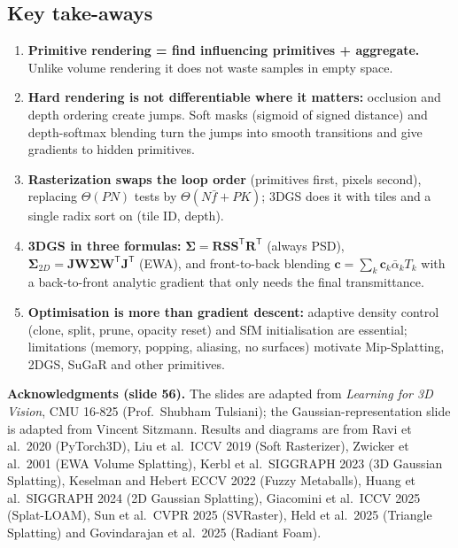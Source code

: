 \documentclass[11pt,a4paper]{article}
\newcommand{\T}{^{\mathsf T}}
\newcommand{\abar}{\bar\alpha}
\theoremstyle{definition}
\theoremstyle{algstyle}
\theoremstyle{plain}
\theoremstyle{remark}
\begin{document}
\subsection*{Key take-aways}
\begin{enumerate}
\item \textbf{Primitive rendering = find influencing primitives + aggregate.} Unlike volume rendering it does not waste samples in empty space.
\item \textbf{Hard rendering is not differentiable where it matters:} occlusion and depth ordering create jumps. Soft masks (sigmoid of signed distance) and depth-softmax blending turn the jumps into smooth transitions and give gradients to hidden primitives.
\item \textbf{Rasterization swaps the loop order} (primitives first, pixels second), replacing $\Theta(PN)$ tests by $\Theta(N\bar f+PK)$; 3DGS does it with tiles and a single radix sort on (tile ID, depth).
\item \textbf{3DGS in three formulas:} $\bm\Sigma=\bm R\bm S\bm S\T\bm R\T$ (always PSD), $\bm\Sigma_{2D}=\bm J\bm W\bm\Sigma\bm W\T\bm J\T$ (EWA), and front-to-back blending $\bm c=\sum_k\bm c_k\abar_kT_k$ with a back-to-front analytic gradient that only needs the final transmittance.
\item \textbf{Optimisation is more than gradient descent:} adaptive density control (clone, split, prune, opacity reset) and SfM initialisation are essential; limitations (memory, popping, aliasing, no surfaces) motivate Mip-Splatting, 2DGS, SuGaR and other primitives.
\end{enumerate}

\bigskip
\textbf{Acknowledgments (slide 56).} The slides are adapted from \emph{Learning for 3D Vision}, CMU 16-825 (Prof.\ Shubham Tulsiani); the Gaussian-representation slide is adapted from Vincent Sitzmann. Results and diagrams are from Ravi et al.\ 2020 (PyTorch3D), Liu et al.\ ICCV 2019 (Soft Rasterizer), Zwicker et al.\ 2001 (EWA Volume Splatting), Kerbl et al.\ SIGGRAPH 2023 (3D Gaussian Splatting), Keselman and Hebert ECCV 2022 (Fuzzy Metaballs), Huang et al.\ SIGGRAPH 2024 (2D Gaussian Splatting), Giacomini et al.\ ICCV 2025 (Splat-LOAM), Sun et al.\ CVPR 2025 (SVRaster), Held et al.\ 2025 (Triangle Splatting) and Govindarajan et al.\ 2025 (Radiant Foam).
\end{document}
